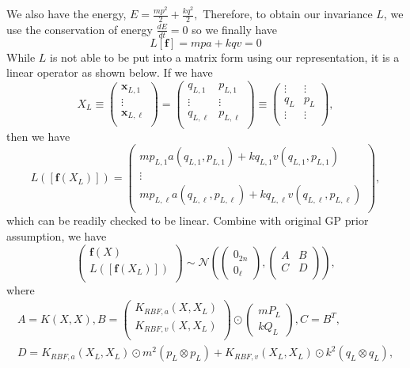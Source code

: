 \documentclass{statsmsc}
\begin{document}
We also have the energy, $E=\frac{mp^2}{2}+\frac{kq^2}{2},$
Therefore, to obtain our invariance $L$, we use the conservation of energy $\frac{dE}{dt}=0$ so we finally have $$L[\mathbf{f}]=mpa+kqv=0$$
While $L$ is not able to be put into a matrix form using our representation, it is a linear operator as shown below. 
If we have $$X_L\equiv\begin{pmatrix}
    \mathbf{x}_{L,1}\\
    \vdots\\
    \mathbf{x}_{L,\ell}\\
\end{pmatrix}=\begin{pmatrix}
    q_{L,1} & p_{L,1}\\
    \vdots & \vdots \\
    q_{L,\ell} & p_{L,\ell}\\
\end{pmatrix}\equiv\begin{pmatrix}
    \vdots & \vdots\\
    q_L & p_L\\
    \vdots & \vdots\\
\end{pmatrix},$$
then we have 
$$
L([\mathbf{f}(X_L)]) = \begin{pmatrix}
   mp_{L,1}a(q_{L,1},p_{L,1}) + kq_{L,1}v(q_{L,1},p_{L,1})\\ 
   \vdots \\
   mp_{L,\ell}a(q_{L,\ell},p_{L,\ell}) + kq_{L,\ell}v(q_{L,\ell},p_{L,\ell})\\ 
\end{pmatrix},
$$
which can be readily checked to be linear.
Combine with original GP prior assumption, we have 
$$
\begin{pmatrix}
    \mathbf{f}(X)\\
    L([\mathbf{f}(X_L)])\\
\end{pmatrix}
\sim\mathcal{N}
\left(\begin{pmatrix}
    0_{2n}\\0_{\ell}
\end{pmatrix},\begin{pmatrix}
   A & B \\
   C & D\\ 
\end{pmatrix}\right),
$$
where
$$
\begin{gathered}
A=K(X,X), B=\begin{pmatrix}
    K_{RBF,a}(X, X_L) \\ K_{RBF,v}(X, X_L) \\
\end{pmatrix}\odot \begin{pmatrix}
    mP_L \\ kQ_L
\end{pmatrix}, C=B^T,\\ D=K_{RBF,a}(X_L, X_L)\odot m^2(p_L\otimes p_L) + K_{RBF,v}(X_L, X_L)\odot k^2(q_L\otimes q_L),
\end{gathered}
$$
\end{document}
